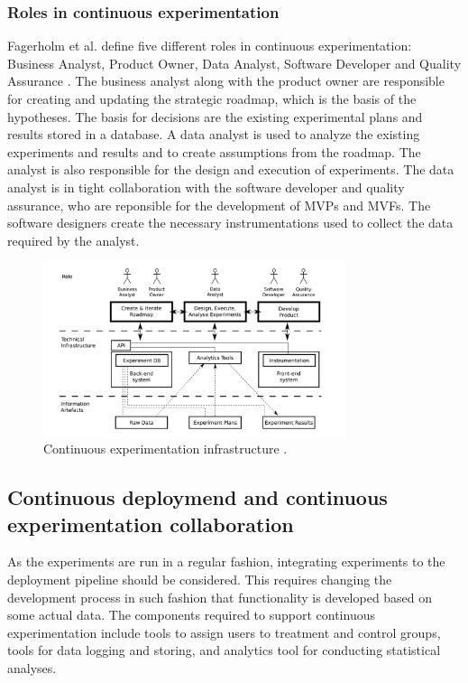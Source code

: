 \documentclass[english]{tktltiki2}
\theoremstyle{definition}
\theoremstyle{remark}
\begin{document}
\subsubsection{Roles in continuous experimentation}
Fagerholm et al. define five different roles in continuous experimentation: Business Analyst, Product Owner, Data Analyst, Software Developer and Quality Assurance \cite{fagerholm2014building}. The business analyst along with the product owner are responsible for creating and updating the strategic roadmap, which is the basis of the hypotheses. The basis for decisions are the existing experimental plans and results stored in a database. A data analyst is used to analyze the existing experiments and results and to create assumptions from the roadmap. The analyst is also responsible for the design and execution of experiments. The data analyst is in tight collaboration with the software developer and quality assurance, who are reponsible for the development of MVPs and MVFs. The software designers create the necessary instrumentations used to collect the data required by the analyst.


\begin{figure}[h]
	\centering
	\includegraphics[width=3.5in]{infra.jpg}
	\caption{Continuous experimentation infrastructure \cite{fagerholm2014building}.}
	\label{fig4}
\end{figure}

\subsection{Continuous deploymend and continuous experimentation collaboration}
As the experiments are run in a regular fashion, integrating experiments to the deployment pipeline should be considered. This requires changing the development process in such fashion that functionality is developed based on some actual data. The components required to support continuous experimentation include tools to assign users to treatment and control groups, tools for data logging and storing, and analytics tool for conducting statistical analyses.
\end{document}
